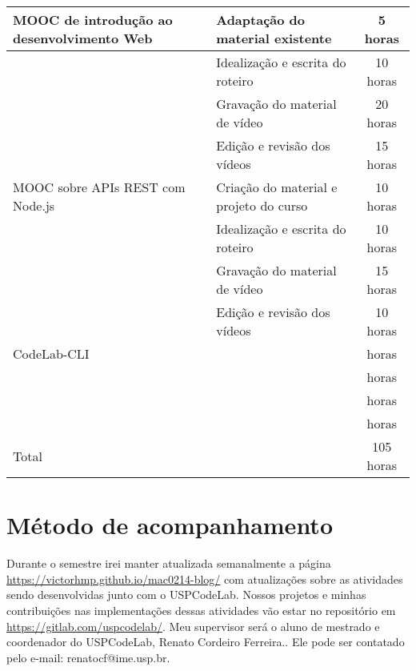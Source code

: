 \documentclass[10pt,twoside,a4paper]{article}
\begin{document}
    \begin{center}
            \begin{tabular}{ |l|l|c| } 
                \hline
                    MOOC de introdução ao desenvolvimento Web
                     & Adaptação do material existente & 5 horas \\
                     \hline
                     & Idealização e escrita do roteiro & 10 horas \\
                     \hline
                     & Gravação do material de vídeo & 20 horas \\
                     \hline
                     & Edição e revisão dos vídeos & 15 horas \\
                \hline
                    MOOC sobre APIs REST com Node.js
                     & Criação do material e projeto do curso & 10 horas \\
                     \hline
                     & Idealização e escrita do roteiro & 10 horas \\
                     \hline
                     & Gravação do material de vídeo &  15 horas \\
                     \hline
                     & Edição e revisão dos vídeos &  10 horas \\
                \hline
                    CodeLab-CLI
                     &  &  horas \\
                     \hline
                     &  &  horas \\
                     \hline
                     &  &  horas \\
                     \hline
                     &  &  horas \\
                
                \hline
                    Total
                    & & 105 horas \\
                \hline
            \end{tabular}
    \end{center}

\section{Método de acompanhamento}

    Durante o semestre irei manter atualizada semanalmente a página \url{https://victorhmp.github.io/mac0214-blog/} com atualizações sobre as atividades sendo desenvolvidas junto com o USPCodeLab. Nossos projetos e minhas contribuições nas implementações dessas atividades vão estar no repositório em \url{https://gitlab.com/uspcodelab/}.
    Meu supervisor será o aluno de mestrado e coordenador do USPCodeLab, Renato Cordeiro Ferreira.. Ele pode ser contatado pelo e-mail: renatocf@ime.usp.br.
\end{document}
